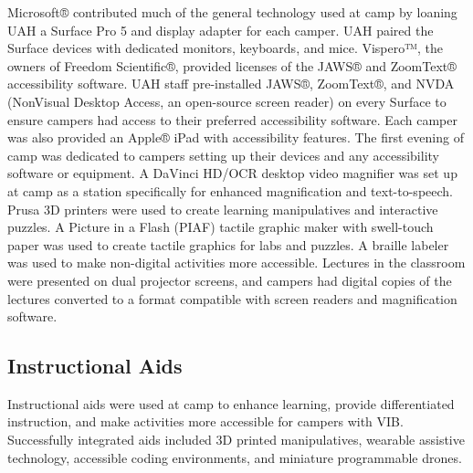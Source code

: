 \documentclass[11.5pt]{sig-alternate} %
\begin{document}
\begin{large}
Microsoft® contributed much of the general technology used at camp by loaning UAH a Surface Pro 5 and display adapter for each camper. UAH paired the Surface devices with dedicated monitors, keyboards, and mice. Vispero™, the owners of Freedom Scientific®, provided licenses of the JAWS® and ZoomText® accessibility software. UAH staff pre-installed JAWS®, ZoomText®, and NVDA (NonVisual Desktop Access, an open-source screen reader) on every Surface to ensure campers had access to their preferred accessibility software. Each camper was also provided an Apple® iPad with accessibility features. The first evening of camp was dedicated to campers setting up their devices and any accessibility software or equipment. A DaVinci HD/OCR desktop video magnifier was set up at camp as a station specifically for enhanced magnification and text-to-speech. Prusa 3D printers were used to create learning manipulatives and interactive puzzles. A Picture in a Flash (PIAF) tactile graphic maker with swell-touch paper was used to create tactile graphics for labs and puzzles. A braille labeler was used to make non-digital activities more accessible. Lectures in the classroom were presented on dual projector screens, and campers had digital copies of the lectures converted to a format compatible with screen readers and magnification software.

\subsection*{Instructional Aids}

Instructional aids were used at camp to enhance learning, provide differentiated instruction, and make activities more accessible for campers with VIB. Successfully integrated aids included 3D printed manipulatives, wearable assistive technology, accessible coding environments, and miniature programmable drones.


\end{large}
\end{document}
